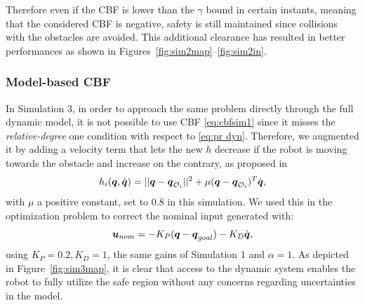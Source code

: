 Therefore even if the CBF is lower than the $\gamma$ bound in certain instants, meaning that the considered CBF is negative, safety is still maintained since collisions with the obstacles are avoided.
This additional clearance has resulted in better performances as shown in Figures~\ref{fig:sim2map}--\ref{fig:sim2in}.
\subsubsection{Model-based CBF}
In Simulation 3, in order to approach the same problem directly through the full dynamic model, it is not possible to use CBF \eqref{eq:cbfsim1} since it misses the \textit{relative-degree} one condition with respect to \eqref{eq:pr dyn}. 
Therefore, we augmented it by adding a velocity term that lets the new $h$ decrease if the robot is moving towards the obstacle and increase on the contrary, as proposed in \cite{vendittelli}
\begin{equation}\label{eq:difmcbf}
    h_i({\boldsymbol{q}},\dot{\boldsymbol{q}})=||{\boldsymbol{q}}-{\boldsymbol{q}}_{\mathcal{O}_i}||^2+\mu({\boldsymbol{q}}-{\boldsymbol{q}}_{\mathcal{O}_i})^T\dot{\boldsymbol{q}},
\end{equation}
with $\mu$ a positive constant, set to $0.8$ in this simulation. We used this in the optimization problem to correct the nominal input generated with:
\begin{equation}
\boldsymbol{u}_{nom}=-K_P({\boldsymbol{q}} - {\boldsymbol{q}}_{goal})-K_D \dot{\boldsymbol{q}},
\end{equation}
using $K_P = 0.2, K_D = 1$, the same gains of Simulation 1 and $\alpha = 1$.
As depicted in Figure~\ref{fig:sim3map}, it is clear that access to the dynamic system enables the robot to fully utilize the safe region without any concerns regarding uncertainties in the model.
